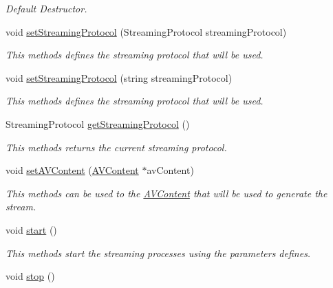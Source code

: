 \begin{DoxyCompactItemize}
\begin{DoxyCompactList}\small\item\em Default Destructor. \item\end{DoxyCompactList}\item 
void \hyperlink{classbr_1_1ufscar_1_1lince_1_1xpta_1_1streaming_1_1StreamingProvider_a8a61c4a2e411c5b3717727c37b67d4bd}{setStreamingProtocol} (StreamingProtocol streamingProtocol)
\begin{DoxyCompactList}\small\item\em This methods defines the streaming protocol that will be used. \item\end{DoxyCompactList}\item 
void \hyperlink{classbr_1_1ufscar_1_1lince_1_1xpta_1_1streaming_1_1StreamingProvider_a9afc0aa0416ae6925e8fa312a57b08d3}{setStreamingProtocol} (string streamingProtocol)
\begin{DoxyCompactList}\small\item\em This methods defines the streaming protocol that will be used. \item\end{DoxyCompactList}\item 
StreamingProtocol \hyperlink{classbr_1_1ufscar_1_1lince_1_1xpta_1_1streaming_1_1StreamingProvider_a733b72dcdd112eec46b4c516c13bfef6}{getStreamingProtocol} ()
\begin{DoxyCompactList}\small\item\em This methods returns the current streaming protocol. \item\end{DoxyCompactList}\item 
void \hyperlink{classbr_1_1ufscar_1_1lince_1_1xpta_1_1streaming_1_1StreamingProvider_a792536fb56d8292d8ca7bc5a2edb1154}{setAVContent} (\hyperlink{classbr_1_1ufscar_1_1lince_1_1xpta_1_1streaming_1_1AVContent}{AVContent} $\ast$avContent)
\begin{DoxyCompactList}\small\item\em This methods can be used to the \hyperlink{classbr_1_1ufscar_1_1lince_1_1xpta_1_1streaming_1_1AVContent}{AVContent} that will be used to generate the stream. \item\end{DoxyCompactList}\item 
void \hyperlink{classbr_1_1ufscar_1_1lince_1_1xpta_1_1streaming_1_1StreamingProvider_acea32e698109cd8d558e5b710f74a48e}{start} ()
\begin{DoxyCompactList}\small\item\em This methods start the streaming processes using the parameters defines. \item\end{DoxyCompactList}\item 
\hypertarget{classbr_1_1ufscar_1_1lince_1_1xpta_1_1streaming_1_1StreamingProvider_a573ecb625afd9283285113ac782c6ff0}{
void \hyperlink{classbr_1_1ufscar_1_1lince_1_1xpta_1_1streaming_1_1StreamingProvider_a573ecb625afd9283285113ac782c6ff0}{stop} ()}
\label{classbr_1_1ufscar_1_1lince_1_1xpta_1_1streaming_1_1StreamingProvider_a573ecb625afd9283285113ac782c6ff0}


\end{DoxyCompactItemize}

